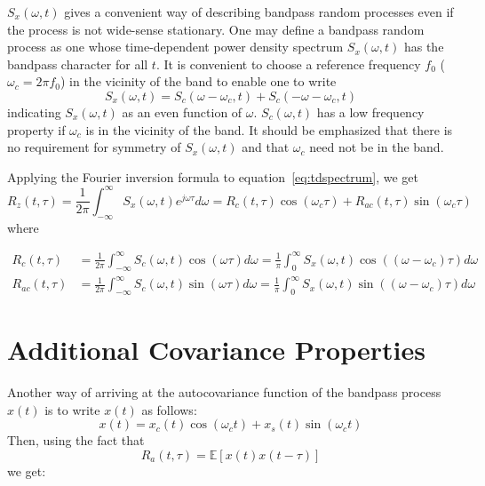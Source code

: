 \documentclass{article}
\begin{document}
$S_x (\omega, t)$ gives a convenient way of describing bandpass random
processes even if the process is not wide-sense stationary. One may define a
bandpass random process as one whose time-dependent power density spectrum
$S_x (\omega, t)$ has the bandpass character for all $t$. It is convenient to
choose a reference frequency $f_0$ ($\omega_c = 2 \pi f_0$) in the vicinity of
the band to enable one to write
\begin{equation}
  S_x (\omega, t) = S_c (\omega - \omega_c, t) + S_c (- \omega - \omega_c, t)
  \label{eq:bandpass_spectrum}
\end{equation}
indicating $S_x (\omega, t)$ as an even function of $\omega$. $S_c (\omega,
t)$ has a low frequency property if $\omega_c$ is in the vicinity of the band.
It should be emphasized that there is no requirement for symmetry of $S_x
(\omega, t)$ and that $\omega_c$ need not be in the band.

Applying the Fourier inversion formula to equation~\eqref{eq:tdspectrum}, we
get
\begin{equation}
  R_z (t, \tau) = \frac{1}{2 \pi}  \int_{- \infty}^{\infty} S_x (\omega, t)
  e^{j \omega \tau} d \omega = R_c (t, \tau) \cos (\omega_c \tau) + R_{ac} (t,
  \tau) \sin (\omega_c \tau) \label{eq:autocov_bandpass}
\end{equation}
where

\begin{align}
  R_c (t, \tau) & = \frac{1}{2 \pi}  \int_{- \infty}^{\infty} S_c (\omega, t)
  \cos (\omega \tau) d \omega = \frac{1}{\pi}  \int_0^{\infty} S_x (\omega, t)
  \cos ((\omega - \omega_c) \tau) d \omega  \label{eq:Rc}\\
  R_{ac} (t, \tau) & = \frac{1}{2 \pi}  \int_{- \infty}^{\infty} S_c (\omega,
  t) \sin (\omega \tau) d \omega = \frac{1}{\pi}  \int_0^{\infty} S_x (\omega,
  t) \sin ((\omega - \omega_c) \tau) d \omega  \label{eq:Rac}
\end{align}

\section{Additional Covariance Properties}

Another way of arriving at the autocovariance function of the bandpass process
$x (t)$ is to write $x (t)$ as follows:
\begin{equation}
  x (t) = x_c (t) \cos (\omega_c t) + x_s (t) \sin (\omega_c t)
  \label{eq:bandpass_decomp}
\end{equation}
Then, using the fact that
\begin{equation}
  R_a (t, \tau) =\mathbb{E} [x (t) x (t - \tau)] \label{eq:Ra}
\end{equation}
we get:
\end{document}
